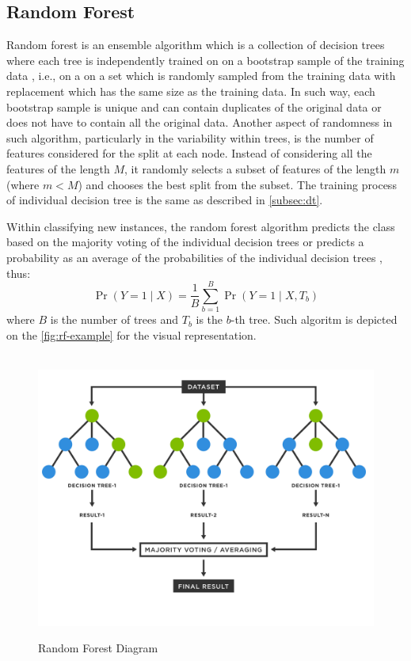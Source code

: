 \subsection{Random Forest}

Random forest is an ensemble algorithm which is a collection of decision trees where each tree is independently trained on on a bootstrap sample of the training data \citep{han2011data}, i.e., on a on a set which is randomly sampled from the training data with replacement which has the same size as the training data. In such way, each bootstrap sample is unique and can contain duplicates of the original data or does not have to contain all the original data.
Another aspect of randomness in such algorithm, particularly in the variability within trees, is the number of features considered for the split at each node.
Instead of considering all the features of the length $M$, it randomly selects a subset of features of the length $m$ (where $m<M$) and chooses the best split from the subset.
The training process of individual decision tree is the same as described in \autoref{subsec:dt}.

Within classifying new instances, the random forest algorithm predicts the class based on the majority voting of the individual decision trees or predicts a probability as an average of the probabilities of the individual decision trees \citep{randomforestmalley}, thus:
\begin{equation}
    \operatorname{Pr}\left(Y=1 \mid X \right) = \frac{1}{B} \sum_{b=1}^{B} \operatorname{Pr}\left(Y=1 \mid X, T_b \right)
\end{equation}
where $B$ is the number of trees and $T_b$ is the $b$-th tree. Such algoritm is depicted on the \autoref{fig:rf-example} for the visual representation.
\begin{figure}[H]
    \centering
    \caption{Random Forest Diagram}\vspace{0.5em}
    \label{fig:rf-example}\
    \includegraphics[width=135mm]{Figures/random-forest-diagram.jpg}

    \vspace{-1em}
\end{figure}
